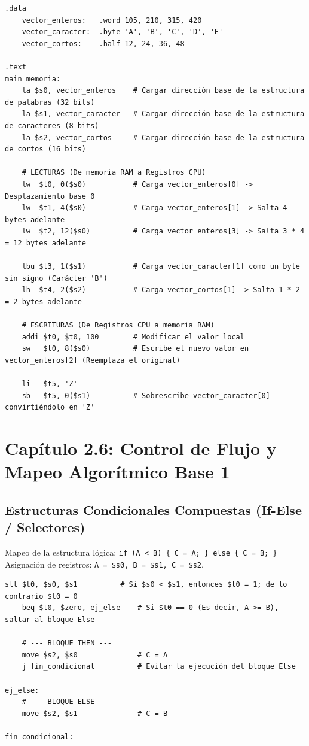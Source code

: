 \documentclass[11pt,letterpaper]{article}
\begin{document}
\begin{lstlisting}[caption={Lectura y almacenamiento de estructuras de datos discretas.}]
.data
    vector_enteros:   .word 105, 210, 315, 420
    vector_caracter:  .byte 'A', 'B', 'C', 'D', 'E'
    vector_cortos:    .half 12, 24, 36, 48

.text
main_memoria:
    la $s0, vector_enteros    # Cargar dirección base de la estructura de palabras (32 bits)
    la $s1, vector_caracter   # Cargar dirección base de la estructura de caracteres (8 bits)
    la $s2, vector_cortos     # Cargar dirección base de la estructura de cortos (16 bits)

    # LECTURAS (De memoria RAM a Registros CPU)
    lw  $t0, 0($s0)           # Carga vector_enteros[0] -> Desplazamiento base 0
    lw  $t1, 4($s0)           # Carga vector_enteros[1] -> Salta 4 bytes adelante
    lw  $t2, 12($s0)          # Carga vector_enteros[3] -> Salta 3 * 4 = 12 bytes adelante
    
    lbu $t3, 1($s1)           # Carga vector_caracter[1] como un byte sin signo (Carácter 'B')
    lh  $t4, 2($s2)           # Carga vector_cortos[1] -> Salta 1 * 2 = 2 bytes adelante

    # ESCRITURAS (De Registros CPU a memoria RAM)
    addi $t0, $t0, 100        # Modificar el valor local
    sw   $t0, 8($s0)          # Escribe el nuevo valor en vector_enteros[2] (Reemplaza el original)
    
    li   $t5, 'Z'
    sb   $t5, 0($s1)          # Sobrescribe vector_caracter[0] convirtiéndolo en 'Z'
\end{lstlisting}

\newpage

\section{Capítulo 2.6: Control de Flujo y Mapeo Algorítmico Base 1}

\subsection{Estructuras Condicionales Compuestas (If-Else / Selectores)}
Mapeo de la estructura lógica: \texttt{if (A < B) \{ C = A; \} else \{ C = B; \}} \\
Asignación de registros: \texttt{A = \$s0, B = \$s1, C = \$s2}.
\begin{lstlisting}[caption={Uso clásico de la comparación slt para bifurcaciones condicionales.}]
    slt $t0, $s0, $s1          # Si $s0 < $s1, entonces $t0 = 1; de lo contrario $t0 = 0
    beq $t0, $zero, ej_else    # Si $t0 == 0 (Es decir, A >= B), saltar al bloque Else
    
    # --- BLOQUE THEN ---
    move $s2, $s0              # C = A
    j fin_condicional          # Evitar la ejecución del bloque Else
    
ej_else:
    # --- BLOQUE ELSE ---
    move $s2, $s1              # C = B

fin_condicional:
\end{lstlisting}
\end{document}
